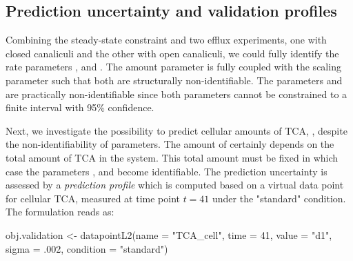 \documentclass[article]{jss}
\begin{document}
\subsection{Prediction uncertainty and validation profiles}

Combining the steady-state constraint and two efflux experiments, one with
closed canaliculi and the other with open canaliculi, we could fully identify
the rate parameters ,  and . The
amount parameter  is fully coupled with the scaling parameter
 such that both are structurally non-identifiable. The parameters
 and  are practically non-identifiable
since both parameters cannot be constrained to a finite interval with 95\%
confidence.

Next, we investigate the possibility to predict cellular amounts of TCA,
, despite the non-identifiability of parameters. 
The amount of  certainly depends on the total
amount of TCA in the system. This total amount must be fixed in which case the
parameters ,  and  become identifiable.
The prediction uncertainty is assessed by a \textit{prediction profile}
which is computed based on a virtual data point for cellular TCA, measured at
time point $t = 41$ under the "standard" condition. The  formulation reads as:
\begin{CodeChunk}
\begin{CodeInput}
obj.validation <- datapointL2(name = "TCA_cell",
			      time = 41,
			      value = "d1",
			      sigma = .002,
			      condition = "standard")
\end{CodeInput}
\end{CodeChunk}
\end{document}

